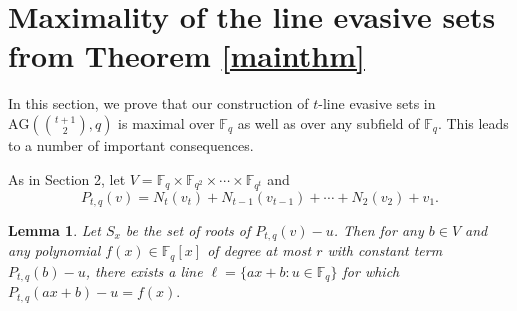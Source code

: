 \documentclass[12pt]{article}
\newtheorem{lem}[thm]{Lemma}
\newcommand{\F}{\mathbb{F}}
\newcommand{\AG}{\text{AG}}
\begin{document}
\section{Maximality of the line evasive sets from Theorem \ref{mainthm}}

In this section, we prove that our construction of $t$-line evasive sets in $\AG(\binom{t+1}{2}, q)$ is maximal over $\F_q$ as well as over any subfield of $\F_q$. This leads to a number of important consequences.

As in Section 2, let $V = \F_q \times \F_{q^2} \times \cdots \times\F_{q^t}$ and 
$$P_{t, q}(v) = N_{t}(v_{t}) + N_{t-1}(v_{t-1}) + \cdots + N_2(v_2) + v_1.$$

\begin{lem}
    Let $S_{x}$ be the set of roots of $P_{t, q}(v) - u$. Then for any $b \in V $ and any polynomial $f(x) \in \F_q[x]$ of degree at most $r$ with constant term $P_{t, q}(b) - u$, there exists a line $\ell = \{ax + b: u \in \F_q \}$ for which 
    $
    P_{t, q}(ax + b) - u = f(x).
    $
\end{lem}
\end{document}
